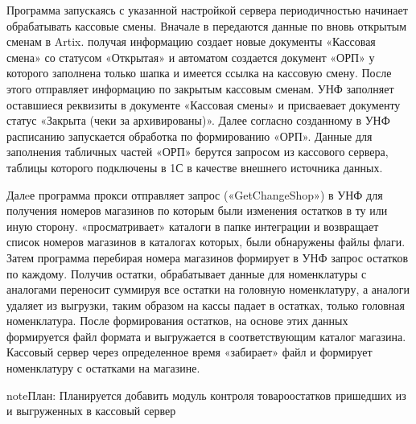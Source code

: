 \documentclass[letterpaper,10pt,russian]{sphinxmanual}
\begin{document}
\sphinxAtStartPar
Программа  запускаясь с указанной настройкой сервера периодичностью начинает обрабатывать кассовые смены.
Вначале в  передаются данные по вновь открытым сменам в Artix.  получая информацию создает новые документы «Кассовая смена» со статусом
«Открытая» и автоматом создается документ «ОРП» у которого заполнена только шапка и имеется ссылка на кассовую смену.
После этого  отправляет информацию по закрытым кассовым сменам. УНФ заполняет оставшиеся реквизиты в документе «Кассовая смены» и присваевает
документу статус «Закрыта (чеки за архивированы)».
Далее согласно созданному в УНФ расписанию запускается обработка по формированию «ОРП». Данные для заполнения табличных частей «ОРП» берутся запросом из
кассового сервера, таблицы которого подключены в 1С в качестве внешнего источника данных.

\sphinxAtStartPar
Далeе программа прокси  отправляет запрос («GetChangeShop») в УНФ для получения номеров магазинов по которым были изменения остатков в ту
или иную сторону.  «просматривает» каталоги в папке интеграции и возвращает список номеров магазинов в каталогах которых, были обнаружены
файлы флаги.
Затем программа  перебирая номера магазинов формирует в УНФ запрос остатков по каждому. Получив остатки,  обрабатывает данные \sphinxhyphen{}
для номенклатуры с аналогами переносит суммируя все остатки на головную номенклатуру, а аналоги удаляет из выгрузки, таким образом на кассы падает в остатках, только
головная номенклатура.
После формирования остатков, на основе этих данных формируется файл формата  и выгружается в соответствующим каталог магазина.
Кассовый сервер через определенное время «забирает» файл и формирует номенклатуру с остатками на магазине.

\begin{sphinxadmonition}{note}{\label{\detokenize{description:id2}}План:}
\sphinxAtStartPar
Планируется добавить модуль контроля товаро\sphinxhyphen{}остатков пришедших из  и выгруженных в кассовый сервер
\end{sphinxadmonition}

\sphinxstepscope
\end{document}
